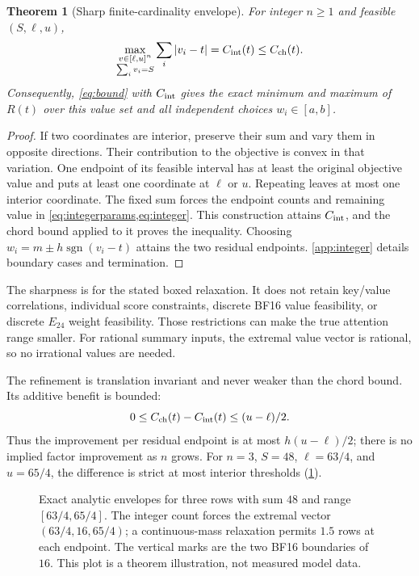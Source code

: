 \documentclass{article}
\theoremstyle{plain}
\newtheorem{theorem}{Theorem}
\theoremstyle{definition}
\theoremstyle{remark}
\newcommand{\E}{E_{24}}
\newcommand{\sgn}{\operatorname{sgn}}
\begin{document}
\begin{theorem}[Sharp finite-cardinality envelope]
\label{thm:integer}
For integer $n\ge1$ and feasible $(S,\ell,u)$,
\begin{equation}
 \max_{\substack{v\in[\ell,u]^n\\\sum_i v_i=S}}
       \sum_i|v_i-t|=C_{\rm int}(t)\le C_{\rm ch}(t).
 \label{eq:sharp}
\end{equation}
Consequently, \cref{eq:bound} with $C_{\rm int}$ gives the exact minimum
and maximum of $R(t)$ over this value set and all independent choices
$w_i\in[a,b]$.
\end{theorem}
\begin{proof}
If two coordinates are interior, preserve their sum and vary them in
opposite directions. Their contribution to the objective is convex in that
variation. One endpoint of its feasible interval has at least the original
objective value and puts at least one coordinate at $\ell$ or $u$.
Repeating leaves at most one interior coordinate. The fixed sum forces the
endpoint counts and remaining value in \cref{eq:integerparams,eq:integer}.
This construction attains $C_{\rm int}$, and the chord bound applied to it
proves the inequality. Choosing
$w_i=m\pm h\sgn(v_i-t)$ attains the two residual endpoints.
\cref{app:integer} details boundary cases and termination.
\end{proof}

The sharpness is for the stated boxed relaxation. It does not retain
key/value correlations, individual score constraints, discrete BF16 value
feasibility, or discrete $\E$ weight feasibility. Those restrictions can
make the true attention range smaller. For rational summary inputs, the
extremal value vector is rational, so no irrational values are needed.

The refinement is translation invariant and never weaker than the chord
bound. Its additive benefit is bounded:
\begin{equation}
 0\le C_{\rm ch}(t)-C_{\rm int}(t)\le (u-\ell)/2.
 \label{eq:improvement}
\end{equation}
Thus the improvement per residual endpoint is at most $h(u-\ell)/2$;
there is no implied factor improvement as $n$ grows. For $n=3$, $S=48$,
$\ell=63/4$, and $u=65/4$, the difference is strict at most interior
thresholds (\cref{fig:envelope}).

\begin{figure}[t]
\centering

\caption{Exact analytic envelopes for three rows with sum $48$ and range
$[63/4,65/4]$. The integer count forces the extremal vector
$(63/4,16,65/4)$; a continuous-mass relaxation permits $1.5$ rows at each
endpoint. The vertical marks are the two BF16 boundaries of $16$.
This plot is a theorem illustration, not measured model data.}
\label{fig:envelope}
\end{figure}
\end{document}
